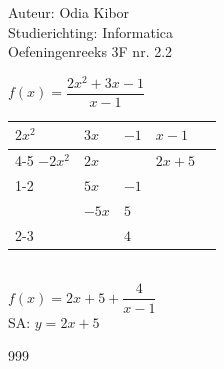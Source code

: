 \documentclass[a4paper]{article}
\begin{document}
  
\noindent \large Auteur: Odia Kibor \\
\noindent \large Studierichting: Informatica\\
\noindent \large Oefeningenreeks 3F nr. 2.2\\

\medskip

\normalsize


$f(x)=\dfrac{2x^2+3x-1}{x-1}$\\

\begin{tabular}{lll|ll}
$2x^2$ & $3x$ & $-1$ & $x-1$ & \\ \cline{4-5}
$-2x^2$ & $2x$ & & $2x+5$ & \\ \cline{1-2}
& $5x$ & $-1$ & & \\
& $-5x$ & $5$ & & \\ \cline{2-3}
& & $4$ & &
\end{tabular}\\

$f(x) = 2x+5 + \dfrac{4}{x-1}$\\

SA: $ y = 2x+5$\\

















\begin{thebibliography}{999}
\end{thebibliography}
\end{document}

